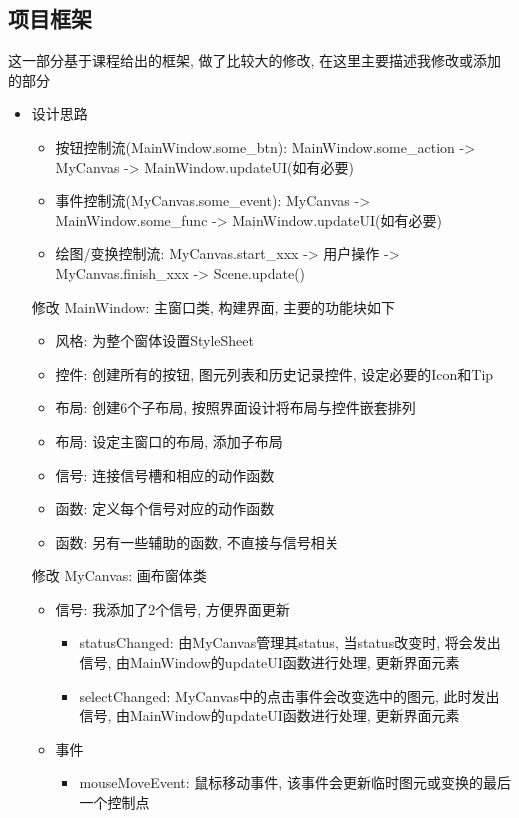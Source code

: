 \documentclass[a4paper,UTF8]{article}
\theoremstyle{definition}
\begin{document}
\subsection{项目框架}
这一部分基于课程给出的框架, 做了比较大的修改, 在这里主要描述我修改或添加的部分
\begin{itemize}
  \item 设计思路\begin{itemize}
    \item 按钮控制流(MainWindow.some\_btn): MainWindow.some\_action -> MyCanvas -> MainWindow.updateUI(如有必要)
    \item 事件控制流(MyCanvas.some\_event): MyCanvas -> MainWindow.some\_func ->  MainWindow.updateUI(如有必要)
    \item 绘图/变换控制流: MyCanvas.start\_xxx -> 用户操作 -> MyCanvas.finish\_xxx -> Scene.update()
  \end{itemize}
  \item [修改]MainWindow: 主窗口类, 构建界面, 主要的功能块如下\begin{itemize}
    \item 风格: 为整个窗体设置StyleSheet
    \item 控件: 创建所有的按钮, 图元列表和历史记录控件, 设定必要的Icon和Tip
    \item 布局: 创建6个子布局, 按照界面设计将布局与控件嵌套排列
    \item 布局: 设定主窗口的布局, 添加子布局
    \item 信号: 连接信号槽和相应的动作函数
    \item 函数: 定义每个信号对应的动作函数
    \item 函数: 另有一些辅助的函数, 不直接与信号相关
  \end{itemize}
  \item [修改]MyCanvas: 画布窗体类\begin{itemize}
    \item 信号: 我添加了2个信号, 方便界面更新\begin{itemize}
      \item statusChanged: 由MyCanvas管理其status, 当status改变时, 将会发出信号, 由MainWindow的updateUI函数进行处理, 更新界面元素
      \item selectChanged: MyCanvas中的点击事件会改变选中的图元, 此时发出信号, 由MainWindow的updateUI函数进行处理, 更新界面元素
    \end{itemize}
    \item 事件 \begin{itemize}
      \item mouseMoveEvent: 鼠标移动事件, 该事件会更新临时图元或变换的最后一个控制点

\end{itemize}
\end{itemize}
\end{itemize}
\end{document}
